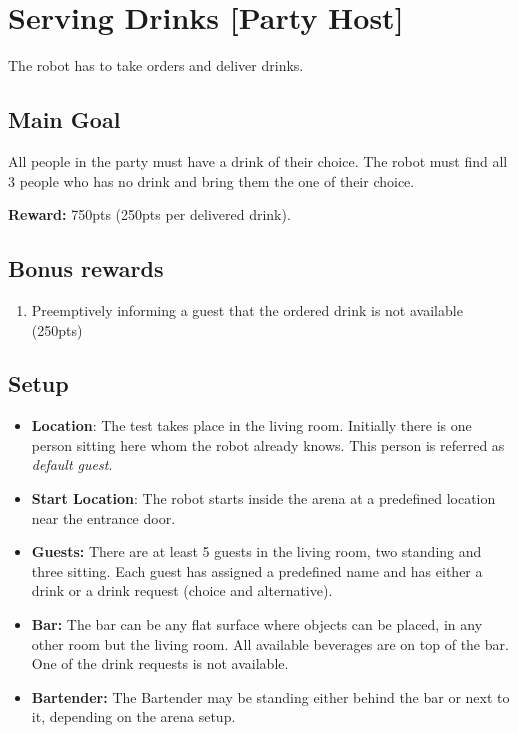 \section{Serving Drinks [Party Host]}
The robot has to take orders and deliver drinks.



\subsection{Main Goal}
All people in the party must have a drink of their choice.
The robot must find all 3 people who has no drink and bring them the one of their choice.

\noindent\textbf{Reward:} 750pts (250pts per delivered drink).

\subsection{Bonus rewards}
\begin{enumerate}[nosep]
	\item Preemptively informing a guest that the ordered drink is not available (250pts)
\end{enumerate}

\subsection{Setup}
\begin{itemize}
	\item \textbf{Location}: The test takes place in the living room.
	Initially there is one person sitting here whom the robot already knows.
	This person is referred as \emph{default guest}.

	\item \textbf{Start Location}: The robot starts inside the arena at a predefined location near the entrance door.

	\item \textbf{Guests:} There are at least 5 guests in the living room, two standing and three sitting.
	Each guest has assigned a predefined name and has either a drink or a drink request (choice and alternative).

	\item \textbf{Bar:} The bar can be any flat surface where objects can be placed, in any other room but the living room.
	All available beverages are on top of the bar.
	One of the drink requests is not available.
	
	\item \textbf{Bartender:} The Bartender may be standing either behind the bar or next to it, depending on the arena setup.
\end{itemize}



